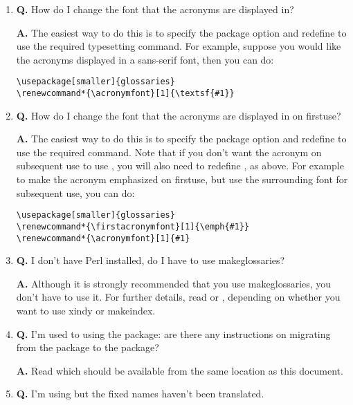 \documentclass{nlctdoc}
\newcommand*{\firstuse}{\gls{firstuse}}
\begin{document}
\begin{enumerate}
\item \textbf{Q.} How do I change the font that the acronyms are displayed in?

\textbf{A.} The easiest way to do this is to specify the  package
option and redefine  to use the required typesetting
command.  For example, suppose you would like the acronyms displayed in 
a sans-serif font, then you can do:
\begin{verbatim}
\usepackage[smaller]{glossaries}
\renewcommand*{\acronymfont}[1]{\textsf{#1}}
\end{verbatim}

\item \textbf{Q.} How do I change the font that the acronyms are displayed in
on \firstuse?

\textbf{A.} The easiest way to do this is to specify the  package
option and redefine  to use the required 
command. Note that if you don't want the acronym on subsequent use
to use , you will also need to redefine ,
as above. For example to make the acronym emphasized on 
\firstuse, but use the surrounding font for subsequent use, you can do:
\begin{verbatim}
\usepackage[smaller]{glossaries}
\renewcommand*{\firstacronymfont}[1]{\emph{#1}}
\renewcommand*{\acronymfont}[1]{#1}
\end{verbatim}

\item \textbf{Q.} I don't have Perl installed, do I have to use 
\gls{makeglossaries}?

\textbf{A.} Although it is strongly recommended that you use
\gls{makeglossaries}, you don't have to use it. For further details,
read  or ,
depending on whether you want to use \gls{xindy} or \gls{makeindex}.

\item \textbf{Q.} I'm used to using the  package: are there any
instructions on migrating from the  package to the
 package?

\textbf{A.} Read  which should be
available from the same location as this document.

\item \textbf{Q.} I'm using  but the fixed names haven't
been translated.


\end{enumerate}
\end{document}
